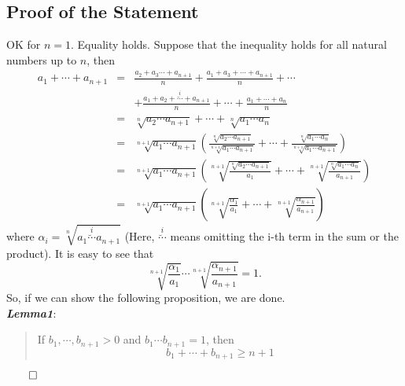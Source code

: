 \documentclass{article}
\begin{document}
\subsection{Proof of the Statement}
\label{sec-1-3}
OK for $n=1$. Equality holds. Suppose that the inequality holds for all natural numbers up to $n$, then
\begin{eqnarray*}
a_1 + \cdots + a_{n+1} & = & \frac{a_2 + a_3 \cdots + a_{n+1}}{n} + \frac{a_1 + a_3 + \cdots + a_{n+1}}{n} + \cdots  \nonumber \\
                       &  &  + \frac{a_1 + a_2 + \overset{i}{\breve{\cdots} } + a_{n+1}}{n} + \cdots + \frac{a_1 + \cdots + a_{n}}{n}\nonumber\\
                       & = &  \sqrt[n]{a_2\cdots a_{n+1}} + \cdots + \sqrt[n]{a_1\cdots a_n} \nonumber \\
                       & = &  \sqrt[n+1]{a_1\cdots a_{n+1}} \left( \frac{\sqrt[n]{a_2\cdots a_{n+1}}}{\sqrt[n+1]{a_1\cdots a_{n+1}}} + \cdots + \frac{\sqrt[n]{a_1\cdots a_n}}{\sqrt[n+1]{a_1\cdots a_{n+1}}} \right) \nonumber \\
                       & = &  \sqrt[n+1]{a_1\cdots a_{n+1}} \left( \sqrt[n+1]{\frac{\sqrt[n]{a_2\cdots a_{n+1}}}{a_1}} + \cdots + \sqrt[n+1]{\frac{\sqrt[n]{a_1\cdots a_{n}}}{a_{n+1}}}\right) \nonumber \\
                       & = &  \sqrt[n+1]{a_1\cdots a_{n+1}} \left( \sqrt[n+1]{\frac{\alpha_1}{a_1}} + \cdots + \sqrt[n+1]{\frac{\alpha_{n+1}}{a_{n+1}}}\right) 
\end{eqnarray*}
where $\alpha_i=\sqrt[n]{a_1\overset{i}{\breve{\cdots}} a_{n+1}}$ (Here, $\overset{i}{\breve{\cdots}}$ means omitting the i-th term in the sum or the product). It is easy to see that
\begin{equation*}
\label{ }
\sqrt[n+1]{\frac{\alpha_1}{a_1}}  \cdots  \sqrt[n+1]{\frac{\alpha_{n+1}}{a_{n+1}}} = 1.
\end{equation*}
So, if we can show the following proposition, we are done.\\
\textbf{\emph{Lemma1}}:
\begin{quote}
If $b_1, \cdots, b_{n+1} >0$ and $b_1 \cdots b_{n+1} = 1$, then
\begin{equation}
\label{AM_GM_normalised}
b_1 + \cdots + b_{n+1} \ge n+1
\end{equation}
\end{quote}
\begin{right}
$\qed$
\end{right}
\end{document}
